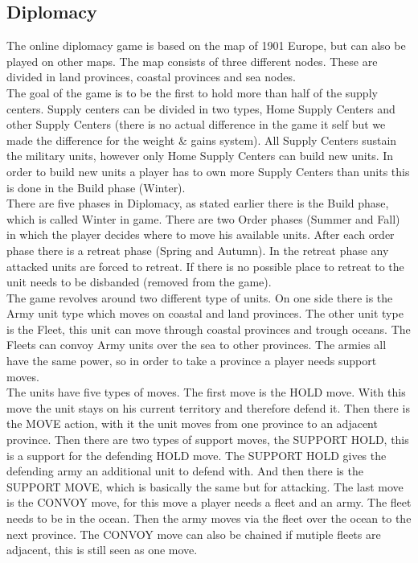 \documentclass[a4paper]{article} %
\begin{document}
\subsection{Diplomacy}
The online diplomacy game is based on the map of 1901 Europe, but can also be played on other maps. The map consists of three different nodes. These are divided in land provinces, coastal provinces and sea nodes.
\\The goal of the game is to be the first to hold more than half of the supply centers. Supply centers can be divided in two types, Home Supply Centers and other Supply Centers (there is no actual difference in the game it self but we made the difference for the weight \& gains system). All Supply Centers sustain the military units, however only Home Supply Centers can build new units. In order to build new units a player has to own more Supply Centers than units this is done in the Build phase (Winter).
\\There are five phases in Diplomacy, as stated earlier there is the Build phase, which is called Winter in game. There are two Order phases (Summer and Fall) in which the player decides where to move his available units. After each order phase there is a retreat phase (Spring and Autumn). In the retreat phase any attacked units are forced to retreat. If there is no possible place to retreat to the unit needs to be disbanded (removed from the game).
\\The game revolves around two different type of units. On one side there is the Army unit type which moves on coastal and land provinces. The other unit type is the Fleet, this unit can move through coastal provinces and trough oceans. The Fleets can convoy Army units over the sea to other provinces. The armies all have the same power, so in order to take a province a player needs support moves.
\\The units have five types of moves. The first move is the HOLD move. With this move the unit stays on his current territory and therefore defend it.
Then there is the MOVE action, with it the unit moves from one province to an adjacent province.
Then there are two types of support moves, the SUPPORT HOLD, this is a support for the defending HOLD move. The SUPPORT HOLD gives the defending army an additional unit to defend with. And then there is the SUPPORT MOVE, which is basically the same but for attacking. The last move is the CONVOY move, for this move a player needs a fleet and an army. The fleet needs to be in the ocean. Then the army moves via the fleet over the ocean to the next province.
The CONVOY move can also be chained if mutiple fleets are adjacent, this is still seen as one move.
\end{document}
